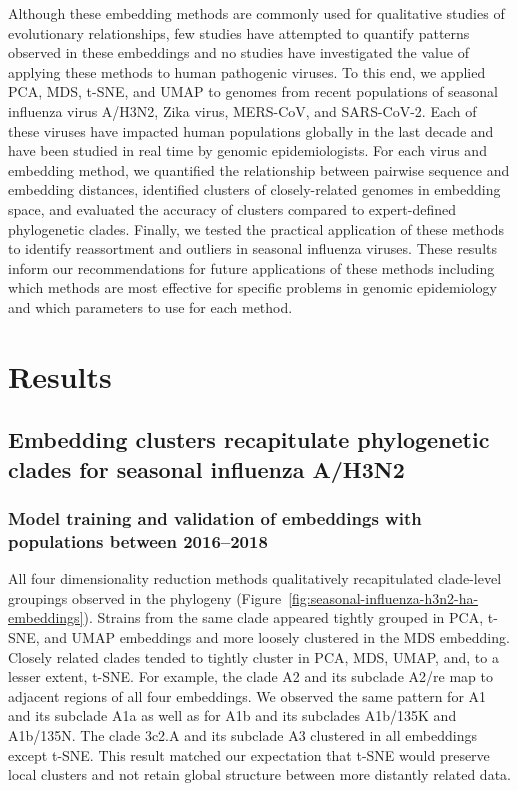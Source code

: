 \documentclass[9pt,lineno]{elife}
\begin{document}
Although these embedding methods are commonly used for qualitative studies of evolutionary relationships, few studies have attempted to quantify patterns observed in these embeddings and no studies have investigated the value of applying these methods to human pathogenic viruses.
To this end, we applied PCA, MDS, t-SNE, and UMAP to genomes from recent populations of seasonal influenza virus A/H3N2, Zika virus, MERS-CoV, and SARS-CoV-2.
Each of these viruses have impacted human populations globally in the last decade and have been studied in real time by genomic epidemiologists.
For each virus and embedding method, we quantified the relationship between pairwise sequence and embedding distances, identified clusters of closely-related genomes in embedding space, and evaluated the accuracy of clusters compared to expert-defined phylogenetic clades.
Finally, we tested the practical application of these methods to identify reassortment and outliers in seasonal influenza viruses.
These results inform our recommendations for future applications of these methods including which methods are most effective for specific problems in genomic epidemiology and which parameters to use for each method.

\section*{Results}

\subsection*{Embedding clusters recapitulate phylogenetic clades for seasonal influenza A/H3N2}

\subsubsection*{Model training and validation of embeddings with populations between 2016--2018}

All four dimensionality reduction methods qualitatively recapitulated clade-level groupings observed in the phylogeny (Figure~\ref{fig:seasonal-influenza-h3n2-ha-embeddings}).
Strains from the same clade appeared tightly grouped in PCA, t-SNE, and UMAP embeddings and more loosely clustered in the MDS embedding.
Closely related clades tended to tightly cluster in PCA, MDS, UMAP, and, to a lesser extent, t-SNE.
For example, the clade A2 and its subclade A2/re map to adjacent regions of all four embeddings.
We observed the same pattern for A1 and its subclade A1a as well as for A1b and its subclades A1b/135K and A1b/135N.
The clade 3c2.A and its subclade A3 clustered in all embeddings except t-SNE.
This result matched our expectation that t-SNE would preserve local clusters and not retain global structure between more distantly related data.
\end{document}
